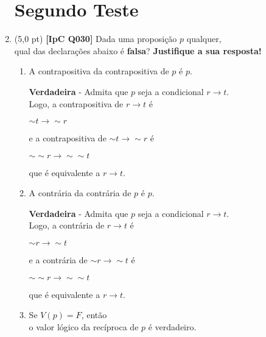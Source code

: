 \documentclass[12pt,a4paper,oneside]{article}
\begin{document}
\begin{enumerate}
	
	\section*{Segundo Teste}
	
	\item (5,0 pt) {\bf [IpC Q030]}	Dada uma proposição $p$ qualquer, \\qual das declarações abaixo é {\bf falsa}? {\bf Justifique a sua resposta!}
	\begin{enumerate}
		\item A contrapositiva da contrapositiva de $p$ é $p$.
		
		\vspace*{0.1cm}
		
		{\color{blue} {\bf Verdadeira} - Admita que $p$ seja a condicional $r \rightarrow t$. \\Logo, a contrapositiva de $r \rightarrow t$ é 
			\begin{center}
				$\sim t \rightarrow \sim r$
			\end{center} 
		e a contrapositiva de $\sim t \rightarrow \sim r$ é 
		\begin{center}
			$\sim \sim r \rightarrow \sim \sim t$
		\end{center} 
		que é equivalente a $r \rightarrow t$.} 
	
		\item A contrária da contrária de $p$ é $p$.
		
			\vspace*{0.1cm}
		
		{\color{blue} {\bf Verdadeira} - Admita que $p$ seja a condicional $r \rightarrow t$. \\Logo, a contrária de $r \rightarrow t$ é 
			\begin{center}
				$\sim r \rightarrow \sim t$
			\end{center} 
			e a contrária de $\sim r \rightarrow \sim t$ é 
			\begin{center}
				$\sim \sim r \rightarrow \sim \sim t$
			\end{center} 
			que é equivalente a $r \rightarrow t$.}
		
		\item Se $V(p) = F$, então \\o valor lógico da recíproca de $p$ é verdadeiro.
		
		\vspace*{0.1cm}
		

\end{enumerate}
\end{enumerate}
\end{document}
